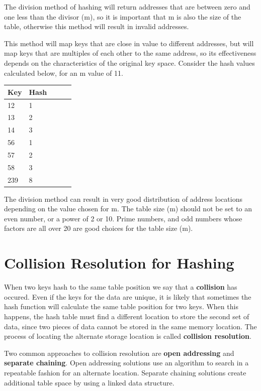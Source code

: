  The division method of hashing will return addresses that are between zero and one less than the divisor (m), so it is important that m is also the size of the table, otherwise this method will result in invalid addresses.


 This method will map keys that are close in value to different addresses, but will map keys that are multiples of each other to the same address, so its effectiveness depends on the characteristics of the original key space. Consider the hash values calculated below, for an m value of 11.
   


\begin{tabular}{lllll}
\hline
Key & Hash  \\ \hline
12  & 1     \\
13  & 2     \\
14  & 3     \\ \hline
56  & 1     \\
57  & 2     \\
58  & 3     \\
239 & 8    
\end{tabular}

The division method can result in very good distribution of address locations depending on the value chosen for m.  The table size (m) should not be set to an even number, or a power of 2 or 10.   Prime numbers, and odd numbers  whose factors are all over 20 are good choices for the table size (m).
   

\section{Collision Resolution for Hashing}

When two keys hash to the same table position we say that a \textbf{collision} has occured.  Even if the keys for the data are unique, it is likely that sometimes the hash function will calculate the same table position for two keys.   When  this happens, the hash table must find a different location to store the second set of data, since two pieces of data cannot be stored in the same memory location.   The process of locating the alternate storage location is called \textbf{collision resolution}.
   
Two common approaches to collision resolution are \textbf{open addressing} and \textbf{separate chaining}.  Open addressing solutions use an algorithm to search in a repeatable fashion for an alternate location.   Separate chaining solutions create additional table space by using a linked data structure.

